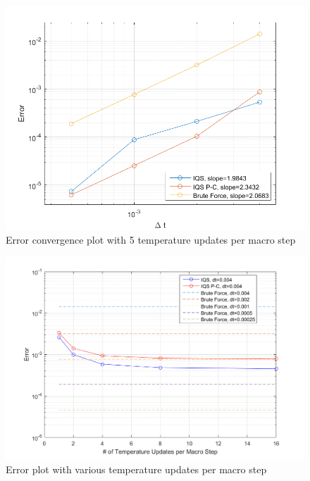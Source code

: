 \documentclass{anstrans}
\begin{document}
\begin{figure}[htbp!]
\centering
\includegraphics[width=\linewidth]{lra_mp_convergence.png}
\caption{Error convergence plot with 5 temperature updates per macro step}
\label{fig:conv}
\end{figure}

\begin{figure}[htbp!]
\centering
\includegraphics[width=\linewidth]{lra_mp.png}
\caption{Error plot with various temperature updates per macro step}
\label{fig:mp}
\end{figure}
\end{document}
